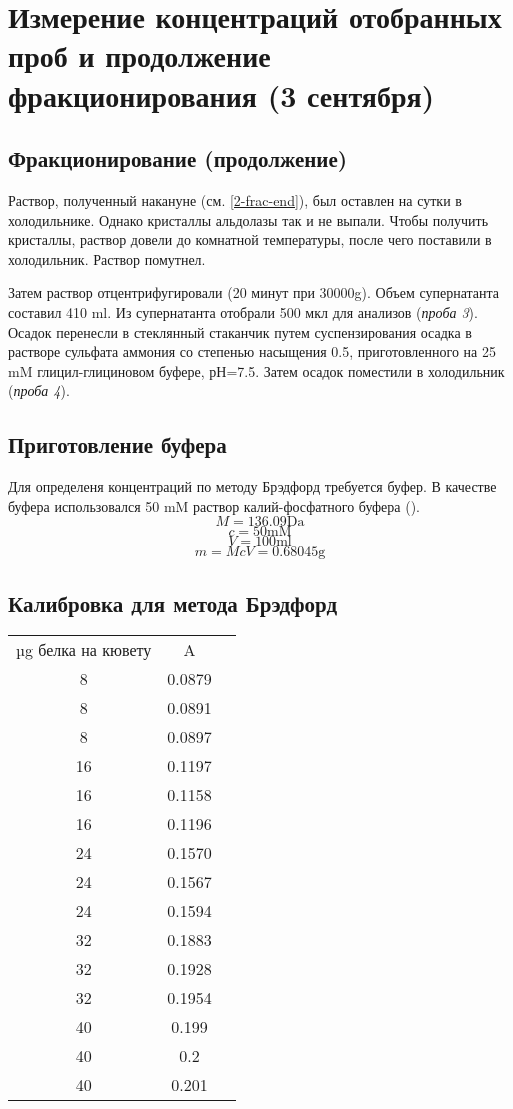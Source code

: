 \section{Измерение концентраций отобранных проб и продолжение фракционирования (3 сентября)}

\subsection{Фракционирование (продолжение)}
Раствор, полученный накануне (см. \ref{2-frac-end}), был оставлен на сутки в холодильнике.
Однако кристаллы альдолазы так и не выпали.
Чтобы получить кристаллы, раствор довели до комнатной температуры,
после чего поставили в холодильник. Раствор помутнел.

Затем раствор отцентрифугировали (20 минут при 30000g).
Объем супернатанта составил 410 ml.
Из супернатанта отобрали 500 мкл для анализов (\emph{проба 3}).
Осадок перенесли в стеклянный стаканчик путем суспензирования осадка
в растворе сульфата аммония со степенью насыщения 0.5,
приготовленного на 25 mM глицил-глициновом буфере, рН=7.5.
Затем осадок поместили в холодильник (\emph{проба 4}).

\subsection{Приготовление буфера}
Для определеня концентраций по методу Брэдфорд требуется буфер.
В качестве буфера использовался 50 mM раствор калий-фосфатного буфера ().
$$ M = 136.09 \text{Da} $$
$$ c = 50 \text{mM} $$
$$ V = 100 \text{ml} $$
$$ m = McV = 0.68045 \text{g} $$

\subsection{Калибровка для метода Брэдфорд}
\label{A0k}

\begin{tabular}{|c|c|c|}
\hline
µg белка на кювету & A \\
8  &  0.0879 \\
8  &  0.0891 \\
8  &  0.0897 \\
\hline
16 &  0.1197 \\
16 &  0.1158 \\
16 &  0.1196 \\
\hline
24 &  0.1570 \\
24 &  0.1567 \\
24 &  0.1594 \\
\hline
32 &  0.1883 \\
32 &  0.1928 \\
32 &  0.1954 \\
\hline
40 &  0.199 \\
40 &  0.2 \\
40 &  0.201 \\
\hline
\end{tabular}

